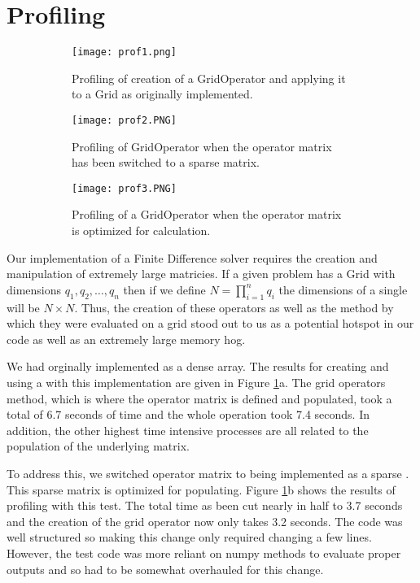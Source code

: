 \documentclass{article}
\begin{document}
	\section{Profiling}
	\begin{figure} 
		\centering
		\begin{subfigure}[t]{0.7\textwidth}
			\centering
			\texttt{[image: prof1.png]}
			\caption{Profiling of creation of a GridOperator and applying it to a Grid as originally implemented.}
		\end{subfigure} \hfill
		\begin{subfigure}[t]{0.7\textwidth}
			\centering
			\texttt{[image: prof2.PNG]}
			\caption{Profiling of GridOperator when the operator matrix has been switched to a sparse matrix.}
		\end{subfigure}
		\begin{subfigure}[t]{0.7\textwidth}
			\centering
			\texttt{[image: prof3.PNG]}
			\caption{Profiling of a GridOperator when the operator matrix is optimized for calculation.}
		\end{subfigure}
		\caption{}
	\label{fig:prof}
	\end{figure}
	Our implementation of a Finite Difference solver requires the creation and manipulation of extremely large matricies. If a given problem has a Grid with dimensions $q_1,q_2,\ldots, q_n$ then if we define $N = \prod_{i=1}^{n}q_{i}$ the dimensions of a single  will be $N\times N$. Thus, the creation of these operators as well as the method by which they were evaluated on a grid stood out to us as a potential hotspot in our code as well as an extremely large memory hog. 

	We had orginally implemented  as a dense  array. The results for creating and using a  with this implementation are given in Figure \ref{fig:prof}a. The grid operators  method, which is where the operator matrix is defined and populated, took a total of 6.7 seconds of time and the whole operation took 7.4 seconds. In addition, the other highest time intensive processes are all related to the population of the underlying matrix. 

	To address this, we switched operator matrix to being implemented as a  sparse . This sparse matrix is optimized for populating. Figure \ref{fig:prof}b shows the results of profiling with this test. The total time as been cut nearly in half to 3.7 seconds and the creation of the grid operator now only takes 3.2 seconds. The code was well structured so making this change only required changing a few lines. However, the test code was more reliant on numpy methods to evaluate proper outputs and so had to be somewhat overhauled for this change.
\end{document}
